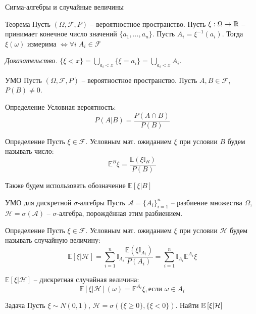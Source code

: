 \documentclass{beamer}
\begin{document}
\begin{frame}{Сигма-алгебры и случайные величины}
    \begin{block}{Теорема}
        Пусть $(\Omega, \mathcal{F} , P)$ -- вероятностное пространство. Пусть $\xi: \Omega \to \mathbb{R}$ -- принимает конечное число значений $\{a_1, \ldots, a_n\}$.
        Пусть $A_i = \xi^{-1}(a_i)$. Тогда $\xi(\omega)$ измерима $\Longleftrightarrow \forall i \; A_i \in \mathcal{F}$
    \end{block}
    \textit{Доказательство.}
    $\{ \xi < x \} = \bigcup\limits_{a_i < x} \{ \xi = a_i\} = \bigcup\limits_{a_i < x} A_i$.
\end{frame}

\begin{frame}{УМО}
    Пусть $\left( \Omega, \mathcal{F} , P\right)$ -- вероятностное пространство. Пусть $A, B \in \mathcal{F} $, $P(B) \neq 0$. 
    \begin{block}{Определение}
        Условная вероятность: 
        $$
            P(A|B) = \dfrac{P(A\cap B)}{P(B)}
        $$
    \end{block}

    \begin{block}{Определение}
        Пусть $\xi \in \mathcal{F}$. Условным мат. ожиданием $\xi$ при условии $B$ будем называть число:
        $$\mathbb{E}^B \xi = \dfrac{\mathbb{E} \left(\xi \mathbb{I}_{B}\right)}{P(B)}$$
    \end{block}
    Также будем использовать обозначение $\mathbb{E}\left[ \xi | B \right]$
\end{frame}

\begin{frame}{УМО для дискретной $\sigma$-алгебры}
    Пусть $\mathcal{A} = \{A_i\}_{i=1}^n$ -- разбиение множества $\Omega$, $\mathcal{H} = \sigma(\mathcal{A})$ -- $\sigma$-алгебра, порождённая этим разбиением.

    \begin{block}{Определение}
        Пусть $\xi \in \mathcal{F}$. Условным мат. ожиданием $\xi$ при условии $\mathcal{H}$ будем называть случайную величину:
        $$\mathbb{E}\left[ \xi | \mathcal{H} \right] = \sum_{i=1}^n \mathbb{I}_{A_i} \dfrac{\mathbb{E} \left(\xi \mathbb{I}_{A_i}\right)}{P(A_i)} = 
        \sum_{i=1}^n \mathbb{I}_{A_i} \mathbb{E}^{A_i}\xi$$
    \end{block}

    $\mathbb{E}\left[ \xi | \mathcal{H} \right]$ -- дискретная случайная величина:
    $$
        \mathbb{E}\left[ \xi | \mathcal{H} \right](\omega) = \mathbb{E}^{A_i} \xi, \text{если } \omega \in A_i
    $$
    \begin{block}{Задача}
        Пусть $\xi \sim N(0, 1)$, $\mathcal{H} = \sigma\left( \{\xi \geq 0\}, \{\xi < 0\} \right)$. Найти $\mathbb{E} \left[ \xi | \mathcal{H} \right]$
    \end{block}
\end{frame}
\end{document}
